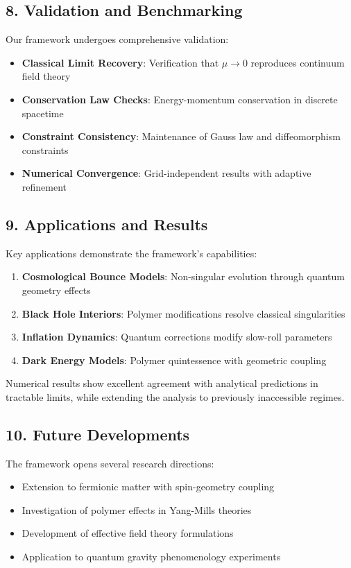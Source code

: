 \documentclass[12pt]{article}
\begin{document}
\subsection*{8. Validation and Benchmarking}
Our framework undergoes comprehensive validation:
\begin{itemize}
  \item \textbf{Classical Limit Recovery}: Verification that $\mu \to 0$ reproduces continuum field theory
  \item \textbf{Conservation Law Checks}: Energy-momentum conservation in discrete spacetime
  \item \textbf{Constraint Consistency}: Maintenance of Gauss law and diffeomorphism constraints
  \item \textbf{Numerical Convergence}: Grid-independent results with adaptive refinement
\end{itemize}

\subsection*{9. Applications and Results}
Key applications demonstrate the framework's capabilities:
\begin{enumerate}
  \item \textbf{Cosmological Bounce Models}: Non-singular evolution through quantum geometry effects
  
  \item \textbf{Black Hole Interiors}: Polymer modifications resolve classical singularities
  
  \item \textbf{Inflation Dynamics}: Quantum corrections modify slow-roll parameters
  
  \item \textbf{Dark Energy Models}: Polymer quintessence with geometric coupling
\end{enumerate}

Numerical results show excellent agreement with analytical predictions in tractable limits, while extending the analysis to previously inaccessible regimes.

\subsection*{10. Future Developments}
The framework opens several research directions:
\begin{itemize}
  \item Extension to fermionic matter with spin-geometry coupling
  \item Investigation of polymer effects in Yang-Mills theories
  \item Development of effective field theory formulations
  \item Application to quantum gravity phenomenology experiments
\end{itemize}
\end{document}
